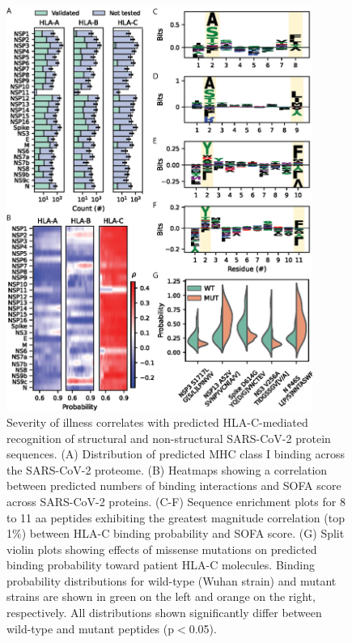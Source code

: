 \documentclass[utf8]{frontiersinFPHY_FAMS} %
\begin{document}
\begin{figure}[h!]
\begin{center}
\includegraphics[width=10cm]{Figure2}%
\end{center}
\caption{Severity of illness correlates with predicted HLA-C-mediated recognition of structural and non-structural SARS-CoV-2 protein sequences. (A) Distribution of predicted MHC class I binding across the SARS-CoV-2 proteome. (B) Heatmaps showing a correlation between predicted numbers of binding interactions and SOFA score across SARS-CoV-2 proteins. (C-F) Sequence enrichment plots for 8 to 11 aa peptides exhibiting the greatest magnitude correlation (top 1\%) between HLA-C binding probability and SOFA score. (G) Split violin plots showing effects of missense mutations on predicted binding probability toward patient HLA-C molecules. Binding probability distributions for wild-type (Wuhan strain) and mutant strains are shown in green on the left and orange on the right, respectively. All distributions shown significantly differ between wild-type and mutant peptides (p$<$0.05).}\label{fig:2}
\end{figure}
\end{document}
